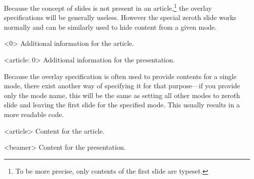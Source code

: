 Because the concept of slides is not present in an article,\footnote{To be more
  precise, only contents of the first slide are typeset.} the overlay
specifications will be generally useless. However the special zeroth slide
works normally and can be similarly used to hide content from a given mode.
\begin{example}[standalone, paperheight=3cm]
\usepackage{beamerarticle}


\begin{frame}<0>
  Additional information for
  the article.
\end{frame}

\begin{frame}<article: 0>
  Additional information for
  the presentation.
\end{frame}
\end{example}

Because the overlay specification is often used to provide contents for a
single mode, there exist another way of specifying it for that purpose---if you
provide only the mode name, this will be the same as setting all other modes to
zeroth slide and leaving the first slide for the specified mode. This usually
results in a more readable code.
\begin{example}[standalone, paperheight=3cm]
\usepackage{beamerarticle}


\begin{frame}<article>
  Content for the article.
\end{frame}

\begin{frame}<beamer>
  Content for the presentation.
\end{frame}
\end{example}
